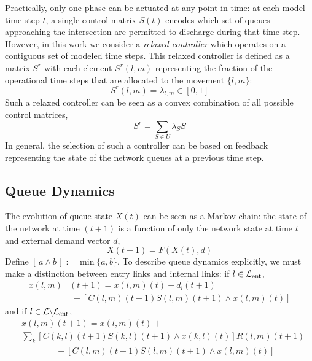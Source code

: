 Practically, only one phase can be actuated at any point in time: at each model time step $t$, a single control matrix $S(t)$ encodes which set of queues approaching the intersection are permitted to discharge during that time step. However, in this work we consider a \emph{relaxed controller} which operates on a contiguous set of modeled time steps. This relaxed controller is defined as a matrix $S^r$ with each element $S^r(l,m)$ representing the fraction of the operational time steps that are allocated to the movement $\{l,m\}$:
\begin{equation}\label{relaxed1}
S^r(l,m) = \lambda_{l,m} \in [0,1]
\end{equation}
Such a relaxed controller can be seen as a convex combination of all possible control matrices,
\begin{equation}\label{relaxed2}
S^r = \displaystyle\sum_{S\in U}\lambda_{S}S
\end{equation}
In general, the selection of such a controller can be based on feedback representing the state of the network queues at a previous time step.

\subsection*{Queue Dynamics}

The evolution of queue state $X(t)$ can be seen as a Markov chain: the state of the network at time $(t+1)$ is a function of only the network state at time $t$ and external demand vector $d$,
\begin{equation}
X(t+1) = F(X(t),d)
\end{equation}
Define $[\,a \wedge b\,]:=\min\{a,b\}$. To describe queue dynamics explicitly, we must make a distinction between entry links and internal links: if $l\in \mathcal{L}_{\text{ent}}$,
\begin{align} \label{entrydynamics}
x(l,m)&(t+1) = x(l,m)(t) + d_{l}(t+1) \\ &  \;  - [C(l,m)(t+1)S(l,m)(t+1) \wedge x(l,m)(t)] \nonumber 
\end{align}
and if $l\in \mathcal{L}\backslash\mathcal{L}_{\text{ent}}$,
\begin{align}\label{internaldynamics}
&x(l,m)(t+1) = x(l,m)(t) + \\ \nonumber
& \sum_{k}[C(k,l)(t+1)S(k,l)(t+1) \wedge x(k,l)(t)]R(l,m)(t+1) \\ \nonumber 
&\qquad  \qquad- [C(l,m)(t+1)S(l,m)(t+1) \wedge x(l,m)(t)] 
\end{align} 



